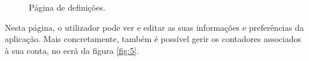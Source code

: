 \begin{figure}[ht!]
\centering
{}
\caption{Página de definições.}
\label{fig:4}
\end{figure}

Nesta página, o utilizador pode ver e editar as suas informações e preferências da aplicação. Mais concretamente, também é possível gerir os contadores associados à sua conta, no ecrã da figura \ref{fig:5}.

